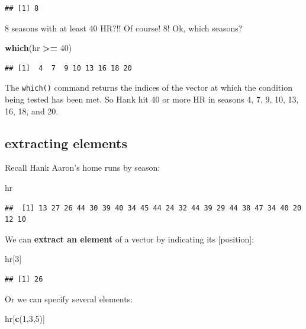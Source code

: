 \documentclass[
]{book}
\newenvironment{Shaded}{\begin{snugshade}}{\end{snugshade}}
\newcommand{\DecValTok}[1]{\textcolor[rgb]{0.00,0.00,0.81}{#1}}
\newcommand{\FunctionTok}[1]{\textcolor[rgb]{0.13,0.29,0.53}{\textbf{#1}}}
\newcommand{\NormalTok}[1]{#1}
\newcommand{\SpecialCharTok}[1]{\textcolor[rgb]{0.81,0.36,0.00}{\textbf{#1}}}
\theoremstyle{definition}
\theoremstyle{definition}
\theoremstyle{definition}
\theoremstyle{definition}
\theoremstyle{remark}
\begin{document}
\begin{verbatim}
## [1] 8
\end{verbatim}

8 seasons with at least 40 HR?!! Of course! 8! Ok, which seasons?

\begin{Shaded}
\begin{Highlighting}[]
\FunctionTok{which}\NormalTok{(hr }\SpecialCharTok{\textgreater{}=} \DecValTok{40}\NormalTok{)}
\end{Highlighting}
\end{Shaded}

\begin{verbatim}
## [1]  4  7  9 10 13 16 18 20
\end{verbatim}

The \texttt{which()} command returns the indices of the vector at which the condition being tested has been met. So Hank hit 40 or more HR in seasons 4, 7, 9, 10, 13, 16, 18, and 20.

\subsection{extracting elements}\label{extracting-elements}

Recall Hank Aaron's home runs by season:

\begin{Shaded}
\begin{Highlighting}[]
\NormalTok{hr}
\end{Highlighting}
\end{Shaded}

\begin{verbatim}
##  [1] 13 27 26 44 30 39 40 34 45 44 24 32 44 39 29 44 38 47 34 40 20 12 10
\end{verbatim}

We can \textbf{extract an element} of a vector by indicating its {[}position{]}:

\begin{Shaded}
\begin{Highlighting}[]
\NormalTok{hr[}\DecValTok{3}\NormalTok{]}
\end{Highlighting}
\end{Shaded}

\begin{verbatim}
## [1] 26
\end{verbatim}

Or we can specify several elements:

\begin{Shaded}
\begin{Highlighting}[]
\NormalTok{hr[}\FunctionTok{c}\NormalTok{(}\DecValTok{1}\NormalTok{,}\DecValTok{3}\NormalTok{,}\DecValTok{5}\NormalTok{)]}
\end{Highlighting}
\end{Shaded}
\end{document}
